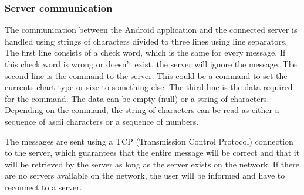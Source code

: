 \documentclass[12pt,a4paper,notitlepage]{report}
\begin{document}


\subsubsection{Server communication}
The communication between the Android application and the connected server is handled using strings of characters divided to three lines using line separators. The first line consists of a check word, which is the same for every message. If this check word is wrong or doesn't exist, the server will ignore the message. The second line is the command to the server. This could be a command to set the currents chart type or size to something else. The third line is the data required for the command. The data can be empty (null) or a string of characters. Depending on the command, the string of characters can be read as either a sequence of ascii characters or a sequence of numbers.

The messages are sent using a TCP (Transmission Control Protocol) connection to the server, which guarantees that the entire message will be correct and that it will be retrieved by the server as long as the server exists on the network. If there are no servers available on the network, the user will be informed and have to reconnect to a server.

\end{document}
